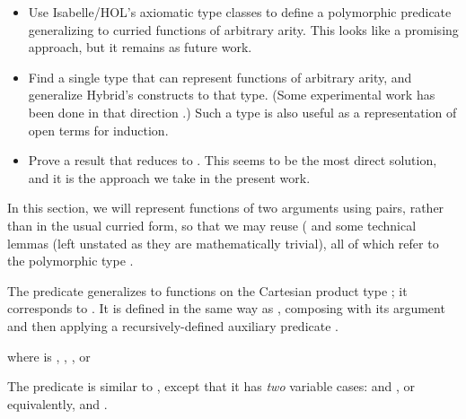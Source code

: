 \documentclass[copyright,creativecommons]{eptcs}
\begin{document}
\begin{itemize}
\item Use Isabelle\slash HOL's axiomatic type classes to define a polymorphic
  predicate generalizing  to curried functions of arbitrary arity.
  This looks like a promising approach, but it remains as future work.
\item Find a single type that can represent functions of arbitrary arity,
  and generalize Hybrid's constructs to that type.  (Some experimental work
  has been done in that direction \cite[Sect.~3.3]{martin:2010a}.)  Such a
  type is also useful as a representation of open terms for induction.
\item Prove a result that reduces  to .  This
  seems to be the most direct solution, and it is the approach we take
  in the present work.
\end{itemize}

In this section, we will represent functions of two arguments using pairs,
rather than in the usual curried form, so that we may reuse
 ( and some technical lemmas
(left unstated as they are mathematically trivial), all of which refer to
the polymorphic type .

\begin{Defn} \formal
\par\nopagebreak

\end{Defn}

The predicate  generalizes  to functions on the
Cartesian product type ; it corresponds to
 \cite{momigliano/ambler/crole:2002}.  It is defined in
the same way as , composing  with its argument and
then applying a recursively-defined auxiliary predicate .

\begin{Defn} \formal
\par\nopagebreak

      where  is\/ , , ,
      or\/ \par\nopagebreak
\par\nopagebreak[3]
\par\nopagebreak

\end{Defn}

The predicate  is similar to , except that it has
\emph{two} variable cases:  and , or
equivalently,  and .

\begin{Lem}\formal
\label{lem:hybrid-abstr2-is-componentwise}

\end{Lem}
\end{document}
